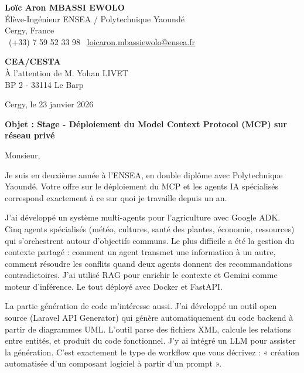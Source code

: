 \documentclass[a4paper,11pt]{article}
\begin{document}
\noindent
\textbf{Loïc Aron MBASSI EWOLO} \\
Élève-Ingénieur ENSEA / Polytechnique Yaoundé \\
Cergy, France \\
\faPhone\ (+33) 7 59 52 33 98 \quad \faEnvelope\ \href{mailto:loicaron.mbassiewolo@ensea.fr}{loicaron.mbassiewolo@ensea.fr}

\vspace{0.6cm}

\noindent
\textbf{CEA/CESTA} \\
À l'attention de M. Yohan LIVET \\
BP 2 - 33114 Le Barp

\hfill Cergy, le 23 janvier 2026

\vspace{0.5cm}

\noindent\textbf{Objet : Stage - Déploiement du Model Context Protocol (MCP) sur réseau privé}

\vspace{0.4cm}

Monsieur,

\vspace{0.3cm}

Je suis en deuxième année à l'ENSEA, en double diplôme avec Polytechnique Yaoundé. Votre offre sur le déploiement du MCP et les agents IA spécialisés correspond exactement à ce sur quoi je travaille depuis un an.

\vspace{0.25cm}

J'ai développé un système multi-agents pour l'agriculture avec Google ADK. Cinq agents spécialisés (météo, cultures, santé des plantes, économie, ressources) qui s'orchestrent autour d'objectifs communs. Le plus difficile a été la gestion du contexte partagé : comment un agent transmet une information à un autre, comment résoudre les conflits quand deux agents donnent des recommandations contradictoires. J'ai utilisé RAG pour enrichir le contexte et Gemini comme moteur d'inférence. Le tout déployé avec Docker et FastAPI.

\vspace{0.25cm}

La partie génération de code m'intéresse aussi. J'ai développé un outil open source (Laravel API Generator) qui génère automatiquement du code backend à partir de diagrammes UML. L'outil parse des fichiers XML, calcule les relations entre entités, et produit du code fonctionnel. J'y ai intégré un LLM pour assister la génération. C'est exactement le type de workflow que vous décrivez : « création automatisée d'un composant logiciel à partir d'un prompt ».
\end{document}
